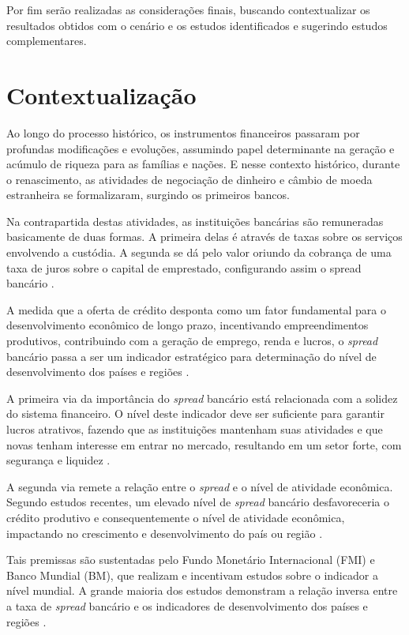 \documentclass[
  12pt,
  12pt,
  openright,
  oneside,
  a4paper,
  chapter=TITLE,
  section=TITLE,
  subsection=TITLE,
  subsubsection=TITLE,
  english,
  portugues,
  sumario=tradicional]{abntex2}
\begin{document}
Por fim serão realizadas as considerações finais, buscando contextualizar os resultados obtidos com o cenário e os estudos identificados e sugerindo estudos complementares.

\section{Contextualização}

Ao longo do processo histórico, os instrumentos financeiros passaram por profundas modificações e evoluções, assumindo papel determinante na geração e acúmulo de riqueza para as famílias e nações. E nesse contexto histórico, durante o renascimento, as atividades de negociação de dinheiro e câmbio de moeda estranheira se formalizaram, surgindo os primeiros bancos.

Na contrapartida destas atividades, as instituições bancárias são remuneradas basicamente de duas formas. A primeira delas é através de taxas sobre os serviços envolvendo a custódia. A segunda se dá pelo valor oriundo da cobrança de uma taxa de juros sobre o capital de emprestado, configurando assim o spread bancário \cite{leite:1996, campello:2005, neves:2007}.

A medida que a oferta de crédito desponta como um fator fundamental para o desenvolvimento econômico de longo prazo, incentivando empreendimentos produtivos, contribuindo com a geração de emprego, renda e lucros, o \emph{spread} bancário passa a ser um indicador estratégico para determinação do nível de desenvolvimento dos países e regiões \cite{WB:2005, levine:1997}.

A primeira via da importância do \emph{spread} bancário está relacionada com a
solidez do sistema financeiro. O nível deste indicador deve ser suficiente para
garantir lucros atrativos, fazendo que as instituições mantenham suas
atividades e que novas tenham interesse em entrar no mercado, resultando em um
setor forte, com segurança e liquidez \cite{levine:1997, dantas:2012, leal:2006}.

A segunda via remete a relação entre o \emph{spread} e o nível de atividade
econômica. Segundo estudos recentes, um elevado nível de \emph{spread} bancário
desfavoreceria o crédito produtivo e consequentemente o nível de atividade
econômica, impactando no crescimento e desenvolvimento do país ou região \cite{WB:2005, dantas:2012, leal:2006}.

Tais premissas são sustentadas pelo Fundo Monetário Internacional (FMI) e Banco Mundial (BM), que realizam e incentivam estudos sobre o indicador a nível mundial. A grande maioria dos estudos demonstram a relação inversa entre a taxa de \emph{spread} bancário e os indicadores de desenvolvimento dos países e regiões \cite{WB:2005}.
\end{document}
